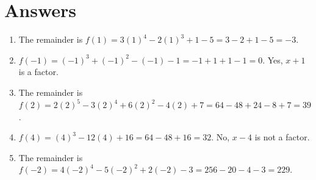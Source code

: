 \documentclass[12pt]{article}
\begin{document}
\vfill

\section*{Answers}

\begin{enumerate}
    \item The remainder is $f(1) = 3(1)^4 - 2(1)^3 + 1 - 5 = 3 - 2 + 1 - 5 = -3$.
    \item $f(-1) = (-1)^3 + (-1)^2 - (-1) - 1 = -1 + 1 + 1 - 1 = 0$. Yes, $x + 1$ is a factor.
    \item The remainder is $f(2) = 2(2)^5 - 3(2)^4 + 6(2)^2 - 4(2) + 7 = 64 - 48 + 24 - 8 + 7 = 39$.
    \item $f(4) = (4)^3 - 12(4) + 16 = 64 - 48 + 16 = 32$. No, $x - 4$ is not a factor.
    \item The remainder is $f(-2) = 4(-2)^4 - 5(-2)^2 + 2(-2) - 3 = 256 - 20 - 4 - 3 = 229$.
\end{enumerate}

\vfill
\end{document}
